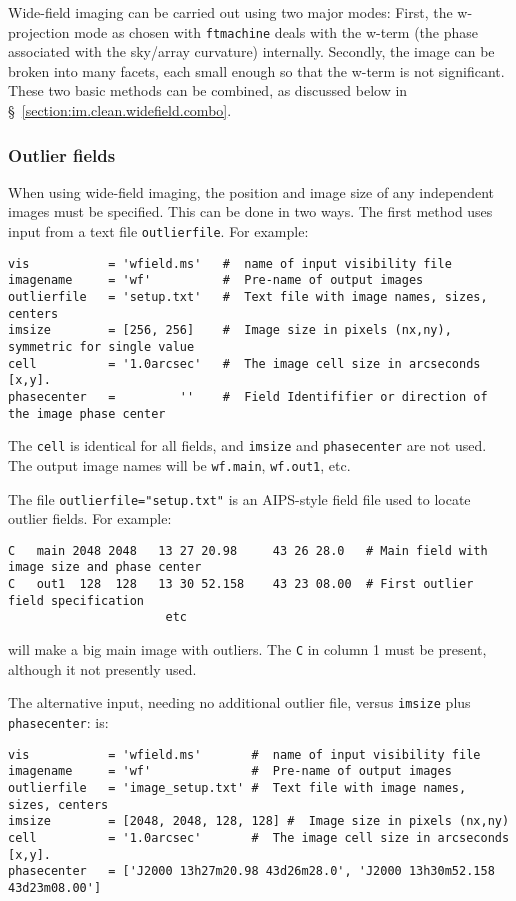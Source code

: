 Wide-field imaging can be carried out using two major modes: First, the
w-projection mode as chosen with {\tt ftmachine} deals with the w-term
(the phase associated with the sky/array curvature) internally.  Secondly, the image can be
broken into many facets, each small enough so that the w-term is not
significant.  These two basic methods can be combined, as discussed
below in \S~\ref{section:im.clean.widefield.combo}.

\subsubsection{Outlier fields}
\label{section:im.clean.widefield.outliers}

When using wide-field imaging, the position and image size of any 
independent images must be specified.  This can be done in two ways.  The first
method uses input from a text file {\tt outlierfile}.  For example:
\small
\begin {verbatim}
vis           = 'wfield.ms'   #  name of input visibility file
imagename     = 'wf'          #  Pre-name of output images
outlierfile   = 'setup.txt'   #  Text file with image names, sizes, centers
imsize        = [256, 256]    #  Image size in pixels (nx,ny), symmetric for single value
cell          = '1.0arcsec'   #  The image cell size in arcseconds [x,y].
phasecenter   =         ''    #  Field Identififier or direction of the image phase center
\end{verbatim}
\normalsize
The {\tt cell} is identical for all fields, and {\tt imsize}
and {\tt phasecenter} are not used.  
The output image names will be {\tt wf.main}, {\tt wf.out1}, etc.

The file {\tt outlierfile="setup.txt"} is an AIPS-style field file
used to locate outlier fields.  For example:
\small
\begin {verbatim}
C   main 2048 2048   13 27 20.98     43 26 28.0   # Main field with image size and phase center
C   out1  128  128   13 30 52.158    43 23 08.00  # First outlier field specification
                      etc
\end{verbatim}
\normalsize
will make a big main image with outliers.
The {\tt C} in column 1 must be present, although it not presently used.

The alternative input, needing no additional outlier file, versus {\tt imsize} plus {\tt
phasecenter}: is: 
\small
\begin{verbatim}
vis           = 'wfield.ms'       #  name of input visibility file
imagename     = 'wf'              #  Pre-name of output images
outlierfile   = 'image_setup.txt' #  Text file with image names, sizes, centers
imsize        = [2048, 2048, 128, 128] #  Image size in pixels (nx,ny)
cell          = '1.0arcsec'       #  The image cell size in arcseconds [x,y].
phasecenter   = ['J2000 13h27m20.98 43d26m28.0', 'J2000 13h30m52.158 43d23m08.00']
\end{verbatim}
\normalsize

